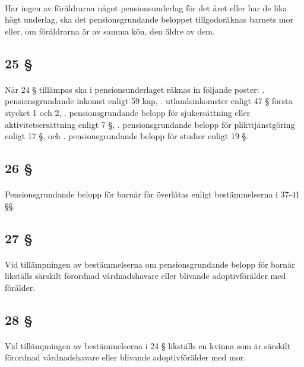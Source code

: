 \documentclass[a4paper,notitlepage,openany,10pt]{book}
\begin{document}
\paragraph*{}
Har ingen av föräldrarna något pensionsunderlag för det året eller har de lika högt underlag, ska det pensionsgrundande beloppet tillgodoräknas barnets mor eller, om föräldrarna är av samma kön, den äldre av dem.
\subsection*{25 §}
\paragraph*{}
När 24 § tillämpas ska i pensionsunderlaget räknas in följande poster:
. pensionsgrundande inkomst enligt 59 kap,
. utlandsinkomster enligt 47 § första stycket 1 och 2,
. pensionsgrundande belopp för sjukersättning eller aktivitetsersättning enligt 7 §,
. pensionsgrundande belopp för plikttjänstgöring enligt 17 §, och
. pensionsgrundande belopp för studier enligt 19 §.
\subsection*{26 §}
\paragraph*{}
Pensionsgrundande belopp för barnår får överlåtas enligt bestämmelserna i 37-41 §§.
\subsection*{27 §}
\paragraph*{}
Vid tillämpningen av bestämmelserna om pensionsgrundande belopp för barnår likställs särskilt förordnad vårdnadshavare eller blivande adoptivförälder med förälder.
\subsection*{28 §}
\paragraph*{}
Vid tillämpningen av bestämmelserna i 24 § likställs en kvinna som är särskilt förordnad vårdnadshavare eller blivande adoptivförälder med mor.
\end{document}
